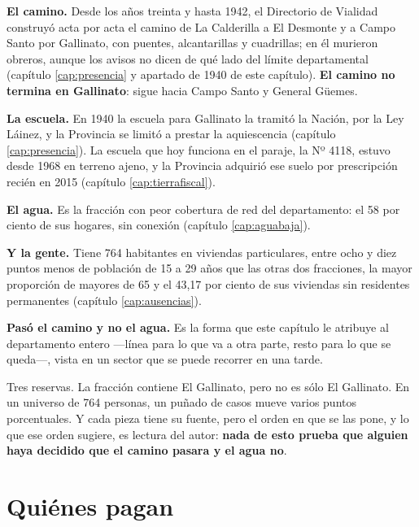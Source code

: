 \textbf{El camino.} Desde los años treinta y hasta 1942, el Directorio de Vialidad construyó
acta por acta el camino de La Calderilla a El Desmonte y a Campo Santo por Gallinato, con
puentes, alcantarillas y cuadrillas; en él murieron obreros, aunque los avisos no dicen de qué
lado del límite departamental (capítulo \ref{cap:presencia} y apartado de 1940 de este capítulo).
\textbf{El camino no termina en Gallinato}: sigue hacia Campo Santo y General Güemes.

\textbf{La escuela.} En 1940 la escuela para Gallinato la tramitó la Nación, por la Ley Láinez, y
la Provincia se limitó a prestar la aquiescencia (capítulo \ref{cap:presencia}). La escuela que hoy funciona en el
paraje, la Nº 4118, estuvo desde 1968 en terreno ajeno, y la Provincia adquirió ese suelo por
prescripción recién en 2015 (capítulo \ref{cap:tierrafiscal}).

\textbf{El agua.} Es la fracción con peor cobertura de red del departamento: el 58 por ciento de
sus hogares, sin conexión (capítulo \ref{cap:aguabaja}).

\textbf{Y la gente.} Tiene 764 habitantes en viviendas particulares, entre ocho y diez puntos
menos de población de 15 a 29 años que las otras dos fracciones, la mayor proporción de mayores de
65 y el 43,17 por ciento de sus viviendas sin residentes permanentes (capítulo \ref{cap:ausencias}).

\begin{cautela}
\textbf{Pasó el camino y no el agua.} Es la forma que este capítulo le atribuye al departamento
entero ---línea para lo que va a otra parte, resto para lo que se queda---, vista en un sector que
se puede recorrer en una tarde.

Tres reservas. La fracción contiene El Gallinato, pero no es sólo El Gallinato. En un universo de
764 personas, un puñado de casos mueve varios puntos porcentuales. Y cada pieza tiene su fuente,
pero el orden en que se las pone, y lo que ese orden sugiere, es lectura del autor: \textbf{nada de
esto prueba que alguien haya decidido que el camino pasara y el agua no}.
\end{cautela}

\section{Quiénes pagan}

